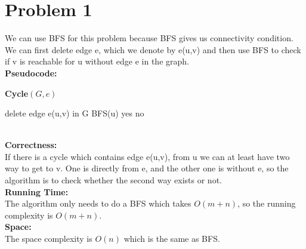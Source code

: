 \documentclass[twoside]{homework}
\begin{document}
\maketitle

\section*{Problem 1}
We can use BFS for this problem because BFS gives us connectivity condition. We can first delete edge e, which we denote by e(u,v) and then use BFS to check if v is reachable for u without edge e in the graph.
\\\textbf{Pseudocode:} \quad
\begin{algorithm}
	\caption*{\textbf{Cycle$(G,e)$}}
	\begin{algorithmic}
		\STATE delete edge e(u,v) in G
		\STATE BFS(u) 
		\RETURN yes
		\ELSE 
		\RETURN no
		\ENDIF
	\end{algorithmic}		
\end{algorithm}
\\\textbf{Correctness:} 
\\If there is a cycle which contains edge e(u,v), from u we can at least have two way to get to v. One is directly from e, and the other one is without e, so the algorithm is to check whether the second way exists or not.
\\\textbf{Running Time:} \quad
\\The algorithm only needs to do a BFS which takes $O(m+n)$, so the running complexity is $O(m+n)$.
\\\textbf{Space:} \quad
\\The space complexity is $O(n)$ which is the same as BFS.
\end{document}
